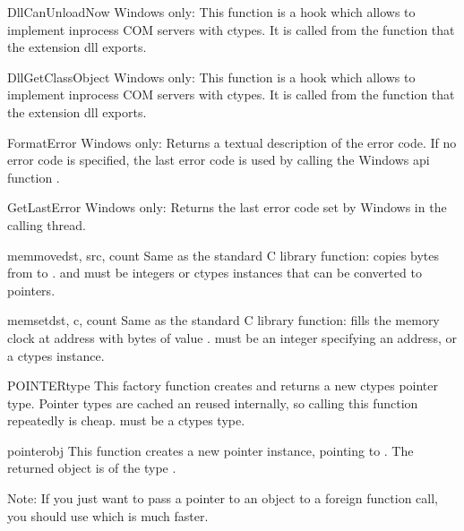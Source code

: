 \begin{funcdesc}{DllCanUnloadNow}{}
Windows only: This function is a hook which allows to implement
inprocess COM servers with ctypes.  It is called from the
 function that the 
extension dll exports.
\end{funcdesc}

\begin{funcdesc}{DllGetClassObject}{}
Windows only: This function is a hook which allows to implement
inprocess COM servers with ctypes.  It is called from the
 function that the 
extension dll exports.
\end{funcdesc}

\begin{funcdesc}{FormatError}{}
Windows only: Returns a textual description of the error code.  If no
error code is specified, the last error code is used by calling the
Windows api function .
\end{funcdesc}

\begin{funcdesc}{GetLastError}{}
Windows only: Returns the last error code set by Windows in the
calling thread.
\end{funcdesc}

\begin{funcdesc}{memmove}{dst, src, count}
Same as the standard C  library function: copies
 bytes from  to .   and
 must be integers or ctypes instances that can be converted to pointers.
\end{funcdesc}

\begin{funcdesc}{memset}{dst, c, count}
Same as the standard C  library function: fills the
memory clock at address  with  bytes of value
.   must be an integer specifying an address, or a ctypes instance.
\end{funcdesc}

\begin{funcdesc}{POINTER}{type}
This factory function creates and returns a new ctypes pointer type.
Pointer types are cached an reused internally, so calling this
function repeatedly is cheap.   must be a ctypes type.
\end{funcdesc}

\begin{funcdesc}{pointer}{obj}
This function creates a new pointer instance, pointing to .
The returned object is of the type .

Note: If you just want to pass a pointer to an object to a foreign
function call, you should use  which is much faster.
\end{funcdesc}

